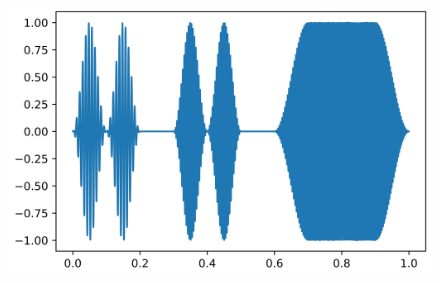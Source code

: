 \begin{figure}[!ht]
	\centering
	\includegraphics[width=0.9\columnwidth]{papers/autotune/sections/frames/images/testsig.jpg}
	\label{fig:frame-testsig}
\end{figure}%

